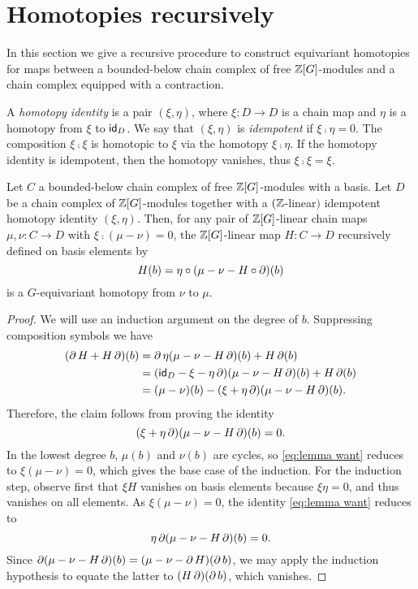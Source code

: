 
\section{Homotopies recursively}\label{s:equivariant homotopy general}

\noindent In this section we give a recursive procedure to construct equivariant homotopies for maps between a bounded-below chain complex of free $\mathbb{Z}[G]$-modules and a chain complex equipped with a contraction.

A \textit{homotopy identity} is a pair $(\xi,\eta)$, where $\xi \colon D \to D$ is a chain map and $\eta$ is a homotopy from $\xi$ to $\mathsf{id}_D$.
We say that $(\xi, \eta)$ is \textit{idempotent} if $\xi \comp \eta = 0$.
The composition $\xi \comp \xi$ is homotopic to $\xi$ via the homotopy $\xi \comp \eta$.
If the homotopy identity is idempotent, then the homotopy vanishes, thus $\xi \comp \xi = \xi$.

\begin{theorem}\label{t:recursive_homotopy}
	Let $C$ a bounded-below chain complex of free $\mathbb{Z}[G]$-modules with a basis.
	Let $D$ be a chain complex of $\mathbb{Z}[G]$-modules together with a $(\mathbb{Z}$-linear$)$ idempotent homotopy identity $(\xi, \eta)$.
	Then, for any pair of $\mathbb{Z}[G]$-linear chain maps $\mu,\nu \colon C \to D$ with $\xi \comp (\mu -\nu) = 0$, the $\mathbb{Z}[G]$-linear map $H \colon C \to D$ recursively defined on basis elements by
	\begin{equation}\label{eq:lemma def}
		H(b) = \eta \mathbin{\circ} (\mu - \nu - H \mathbin{\circ} \operatorname{\partial})(b)
	\end{equation}
	is a $G$-equivariant homotopy from $\nu$ to $\mu$.
\end{theorem}

\begin{proof}
	We will use an induction argument on the degree of $b$.
	Suppressing composition symbols we have
	\begin{align*}
		(\operatorname{\partial} H + H \operatorname{\partial})(b)
		&= \operatorname{\partial} \eta(\mu - \nu - H \operatorname{\partial})(b) + H \operatorname{\partial} (b) \\
		&= (\mathsf{id}_D - \xi - \eta \operatorname{\partial})(\mu - \nu - H \operatorname{\partial})(b) + H \operatorname{\partial}(b) \\
		&= (\mu-\nu)(b) - (\xi + \eta \operatorname{\partial})(\mu - \nu - H \operatorname{\partial})(b).
	\end{align*}
	Therefore, the claim follows from proving the identity
	\begin{equation}\label{eq:lemma want}
		(\xi + \eta \operatorname{\partial})(\mu - \nu - H \operatorname{\partial})(b) = 0.
	\end{equation}
	In the lowest degree $b$, $\mu(b)$ and $\nu(b)$ are cycles, so \eqref{eq:lemma want} reduces to $\xi(\mu-\nu) = 0$, which gives the base case of the induction.	For the induction step, observe first that $\xi H$ vanishes on basis elements because $\xi\eta = 0$, and thus vanishes on all elements. As $\xi (\mu-\nu) = 0$, the identity \eqref{eq:lemma want} reduces to
	\[
	\eta\operatorname{\partial}(\mu-\nu-H\operatorname{\partial})(b) = 0.
	\]
	Since $\operatorname{\partial}(\mu-\nu-H\operatorname{\partial})(b) = (\mu-\nu-\operatorname{\partial} H)(\operatorname{\partial} b)$, we may apply the induction hypothesis to equate the latter to $(H\operatorname{\partial})(\operatorname{\partial} b)$, which vanishes.
\end{proof}

